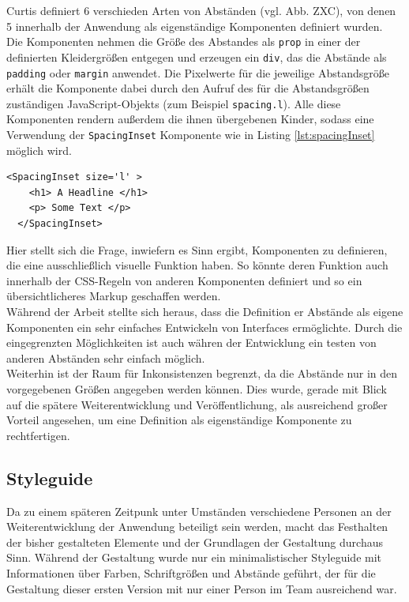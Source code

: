 Curtis definiert 6 verschieden Arten von Abständen (vgl. Abb. ZXC), von denen 5 innerhalb der Anwendung als eigenständige Komponenten definiert wurden.\\
Die Komponenten nehmen die Größe des Abstandes als \verb|prop| in einer der definierten Kleidergrößen entgegen und erzeugen ein \verb|div|, das die Abstände als \verb|padding| oder \verb|margin| anwendet.
Die Pixelwerte für die jeweilige Abstandsgröße erhält die Komponente dabei durch den Aufruf des für die Abstandsgrößen zuständigen JavaScript-Objekts (zum Beispiel \verb|spacing.l|). Alle diese Komponenten rendern außerdem die ihnen übergebenen Kinder, sodass eine Verwendung der \verb|SpacingInset| Komponente wie in Listing \ref{lst:spacingInset} möglich wird.

\begin{lstlisting}[caption=Beispielhafte Verwendung einer Komponente für Abstände, label=lst:spacingInset]
  <SpacingInset size='l' >
    <h1> A Headline </h1>
    <p> Some Text </p>
  </SpacingInset>
\end{lstlisting}

Hier stellt sich die Frage, inwiefern es Sinn ergibt, Komponenten zu definieren, die eine ausschließlich visuelle Funktion haben.
So könnte deren Funktion auch innerhalb der CSS-Regeln von anderen Komponenten definiert und so ein übersichtlicheres Markup geschaffen werden.\\
Während der Arbeit stellte sich heraus, dass die Definition er Abstände als eigene Komponenten ein sehr einfaches Entwickeln von Interfaces ermöglichte. Durch die eingegrenzten Möglichkeiten ist auch währen der Entwicklung ein testen von anderen Abständen sehr einfach möglich.\\
Weiterhin ist der Raum für Inkonsistenzen begrenzt, da die Abstände nur in den vorgegebenen Größen angegeben werden können. Dies wurde, gerade mit Blick auf die spätere Weiterentwicklung und Veröffentlichung, als ausreichend großer Vorteil angesehen, um eine Definition als eigenständige Komponente zu rechtfertigen.

\subsection{Styleguide}
\label{chap:styleguide}
Da zu einem späteren Zeitpunk unter Umständen verschiedene Personen an der Weiterentwicklung der Anwendung beteiligt sein werden, macht das Festhalten der bisher gestalteten Elemente und der Grundlagen der Gestaltung durchaus Sinn.
Während der Gestaltung wurde nur ein minimalistischer Styleguide mit Informationen über Farben, Schriftgrößen und Abstände geführt, der für die Gestaltung dieser ersten Version mit nur einer Person im Team ausreichend war.

